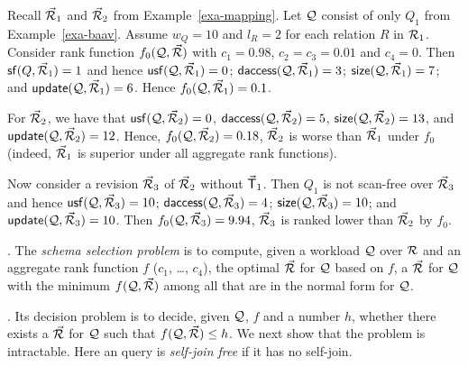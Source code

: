 \begin{example}\label{exa-measures}
Recall $\vec{{\mathcal R}}_{1}$ and $\vec{{\mathcal R}}_{2}$ from Example~\ref{exa-mapping}.
Let $\mathcal Q$ consist of only $Q_{1}$ from Example~\ref{exa-baav}.
Assume $w_{Q} = 10$ and $l_{R} = 2$ for each relation $R$ in
${\mathcal R}_{1}$. Consider rank function $f_{0}(\mathcal Q, \vec{{\mathcal R}})$ with $c_{1} = 0.98$,
$c_{2} = c_{3} = 0.01$ and $c_{4} = 0$.
%
Then ${\mathsf{sf}}(Q,\allowbreak \vec{{\mathcal R}}_{1}) \allowbreak = \allowbreak 1$ and hence ${\mathsf{usf}}(\mathcal Q, \allowbreak
\vec{{\mathcal R}}_{1}) \allowbreak = \allowbreak 0$;
${\mathsf{daccess}}(\mathcal Q, \allowbreak \vec{{\mathcal R}}_{1}) \allowbreak = \allowbreak 3$;
${\mathsf{size}}(\mathcal Q, \allowbreak \vec{{\mathcal R}}_{1}) \allowbreak = \allowbreak 7$; and
${\mathsf{update}}(\mathcal Q, \allowbreak \vec{{\mathcal R}}_{1}) \allowbreak = \allowbreak 6$.
Hence $f_{0}(\mathcal Q, \vec{{\mathcal R}}_{1}) = 0.1$.

\vspace{0.6ex}
For $\vec{{\mathcal R}}_{2}$, we have that ${\mathsf{usf}}(\mathcal Q, \allowbreak
\vec{{\mathcal R}}_{2})\allowbreak =\allowbreak 0$, ${\mathsf{daccess}}(\mathcal Q, \allowbreak \vec{{\mathcal R}}_{2}) \allowbreak = \allowbreak
5$, ${\mathsf{size}}(\mathcal Q, \allowbreak \vec{{\mathcal R}}_{2}) \allowbreak = \allowbreak 13$, and ${\mathsf{update}}(\mathcal Q,
\allowbreak \vec{{\mathcal R}}_{2}) \allowbreak = \allowbreak 12$. Hence, $f_{0}(\mathcal Q, \vec{{\mathcal R}}_{2}) =
0.18$, \ie $\vec{{\mathcal R}}_{2}$ is worse than $\vec{{\mathcal R}}_{1}$ under
$f_{0}$ (indeed, $\vec{{\mathcal R}}_{1}$ is superior under all aggregate rank functions). 

\vspace{0.6ex}
Now consider a revision $\vec{{\mathcal R}}_{3}$ of $\vec{{\mathcal R}}_{2}$ without
$\vec{\protect\mathsf{T}}_{1}$. Then
$Q_{1}$ is not
scan-free over $\vec{{\mathcal R}}_{3}$ and hence ${\mathsf{usf}}(\mathcal Q,\allowbreak \vec{{\mathcal R}}_{3})
= 10$; ${\mathsf{daccess}}(\mathcal Q, \allowbreak \vec{{\mathcal R}}_{3}) = 4$; 
${\mathsf{size}}(\mathcal Q, \allowbreak \vec{{\mathcal R}}_{3}) \allowbreak = \allowbreak 10$; and
${\mathsf{update}}(\mathcal Q, \allowbreak \vec{{\mathcal R}}_{3}) \allowbreak = \allowbreak 10$.
Then $f_{0}(\mathcal Q,\allowbreak \vec{{\mathcal R}}_{3})\allowbreak =\allowbreak 9.94$, \ie $\vec{{\mathcal R}}_{3}$
is ranked lower than $\vec{{\mathcal R}}_{2}$ by $f_{0}$.
\end{example}

\vspace{-0.4ex}




.
The {\em \baav schema selection problem} is to compute,
given a workload $\mathcal Q$ over ${\mathcal R}$ and an aggregate rank function
$f$ (\ie $c_{1}$, \ldots, $c_{4}$),
the optimal \bds $\vec{{\mathcal R}}$ for $\mathcal Q$ based on $f$, \ie a \bds
$\vec{{\mathcal R}}$ for $\mathcal Q$ with the minimum $f(\mathcal Q, \vec{{\mathcal R}})$ among all \bdss
that are in the normal form for $\mathcal Q$.


. Its  decision problem is to decide, given $\mathcal Q$, $f$ and a
number $h$, whether there exists a \bds $\vec{{\mathcal R}}$ for
$\mathcal Q$ such that $f(\mathcal Q, \vec{{\mathcal R}})\leq h$.
We next show that the problem is intractable.
  Here an \SPC query 
  is {\em self-join free} if it has no self-join.



